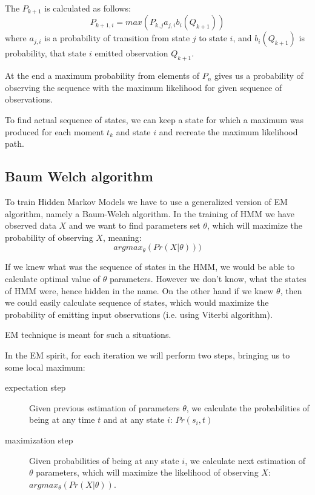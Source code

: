 \documentclass[12pt,a4paper,english]{article}
\begin{document}
The $P_{k+1}$ is calculated as follows:
\begin{equation}
    P_{k+1, i} = max(P_{k, j} a_{j, i} b_i(Q_{k+1}))
\end{equation}
where $a_{j, i}$ is a probability of transition from state $j$ to state $i$, \newline
and $b_i(Q_{k+1})$ is probability, that state $i$ emitted observation $Q_{k+1}$. \newline

At the end a maximum probability from elements of $P_n$ gives us a probability of observing the sequence with the maximum likelihood for given sequence of observations. \newline

To find actual sequence of states, we can keep a state for which a maximum was produced for each moment $t_k$ and state $i$ and recreate the maximum likelihood path.

\newpage
\subsection{Baum Welch algorithm}

To train Hidden Markov Models we have to use a generalized version of EM algorithm, namely a Baum-Welch algorithm. \newline
In the training of HMM we have observed data $X$ and we want to find parameters set $\theta$, which will maximize the probability of observing $X$, meaning:
\begin{equation}
    argmax_\theta(Pr(X | \theta)))
\end{equation}

If we knew what was the sequence of states in the HMM, we would be able to calculate optimal value of $\theta$ parameters. However we don't know, what the states of HMM were, hence hidden in the name. On the other hand if we knew $\theta$, then we could easily calculate sequence of states, which would maximize the probability of emitting input observations (i.e. using Viterbi algorithm). \newline

EM technique is meant for such a situations. \newline

In the EM spirit, for each iteration we will perform two steps, bringing us to some local maximum: \newline
\begin{description}
    \item[expectation step]
	Given previous estimation of parameters $\theta$, we calculate the probabilities of being at any time $t$ and at any state $i$: $Pr(s_i, t)$
    \item[maximization step]
	Given probabilities of being at any state $i$, we calculate next estimation of $\theta$ parameters, which will maximize the likelihood of observing $X$: $argmax_\theta(Pr(X | \theta))$.
\end{description}
\end{document}
